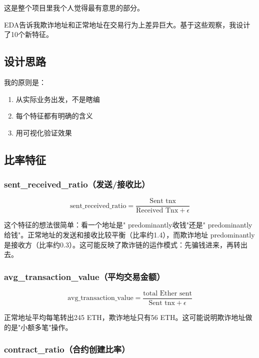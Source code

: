 \documentclass[12pt,a4paper]{article}
\begin{document}
这是整个项目里我个人觉得最有意思的部分。

EDA告诉我欺诈地址和正常地址在交易行为上差异巨大。基于这些观察，我设计了10个新特征。

\subsection{设计思路}

我的原则是：
\begin{enumerate}
    \item 从实际业务出发，不是瞎编
    \item 每个特征都有明确的含义
    \item 用可视化验证效果
\end{enumerate}

\subsection{比率特征}

\subsubsection{sent\_received\_ratio（发送/接收比）}

\begin{equation}
\text{sent\_received\_ratio} = \frac{\text{Sent tnx}}{\text{Received Tnx} + \epsilon}
\end{equation}

这个特征的想法很简单：看一个地址是" predominantly收钱"还是" predominantly给钱"。正常地址的发送和接收比较平衡（比率约1.4），而欺诈地址 predominantly是接收方（比率约0.3）。这可能反映了欺诈链的运作模式：先骗钱进来，再转出去。

\subsubsection{avg\_transaction\_value（平均交易金额）}

\begin{equation}
\text{avg\_transaction\_value} = \frac{\text{total Ether sent}}{\text{Sent tnx} + \epsilon}
\end{equation}

正常地址平均每笔转出245 ETH，欺诈地址只有56 ETH。这可能说明欺诈地址做的是"小额多笔"操作。

\subsubsection{contract\_ratio（合约创建比率）}
\end{document}
